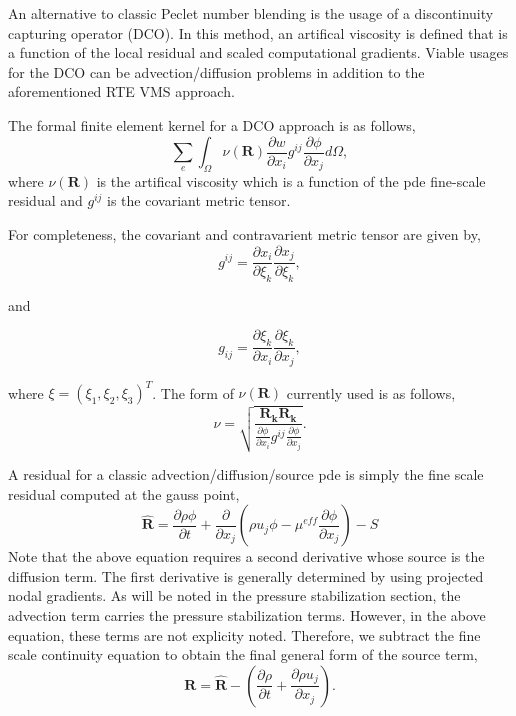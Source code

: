 An alternative to classic Peclet number blending is the usage of a discontinuity capturing operator (DCO).
In this method, an artifical viscosity is defined that is a function of the local residual and scaled computational 
gradients. Viable usages for the DCO can be advection/diffusion problems in addition to the aforementioned RTE
VMS approach.

The formal finite element kernel for a DCO approach is as follows,
\begin{equation}
  \sum_e \int_\Omega \nu(\mathbf{R}) \frac{\partial w}{\partial x_i} g^{ij} \frac{\partial \phi} {\partial x_j} d\Omega,
\label{dcoFEMForm}
\end{equation}
where $\nu(\mathbf{R})$ is the artifical viscosity which is a function of the pde fine-scale residual and $g^{ij}$ 
is the covariant metric tensor.

For completeness, the covariant and contravarient metric tensor are given by,
\begin{equation}
  g^{ij} = \frac{\partial x_i} {\partial \xi_k}\frac{\partial x_j} {\partial \xi_k},
\label{coVariant}
\end{equation}

 and

\begin{equation}
  g_{ij} = \frac{\partial \xi_k} {\partial x_i} \frac{\partial \xi_k} {\partial x_j},
\label{coVariant}
\end{equation}

where $\xi = (\xi_1, \xi_2, \xi_3)^T$.
%
The form of $\nu(\mathbf{R})$ currently used is as follows,
\begin{equation}
  \nu = \sqrt{ \frac{\mathbf{R_k} \mathbf{R_k}} {\frac {\partial \phi}{\partial x_i} g^{ij} \frac{\partial \phi}{\partial x_j}} }.
\label{nuOne}
\end{equation}

A residual for a classic advection/diffusion/source pde is simply the fine scale residual computed at the gauss point,
\begin{equation}
 \mathbf{\hat R} = \frac{\partial \rho \phi}{\partial t} + \frac{\partial}{\partial x_j} (\rho u_j \phi - \mu^{eff} \frac{\partial \phi}{\partial x_j}) -S
 \label{dcoResidual}
\end{equation}
Note that the above equation requires a second derivative whose source is the diffusion term. The first derivative 
is generally determined by using projected nodal gradients. As will be noted in the pressure stabilization section, 
the advection term carries the pressure stabilization terms. However, in the above equation, these terms are not 
explicity noted. Therefore, we subtract the fine scale continuity equation to obtain the final general form of 
the source term,
\begin{equation}
 \mathbf{R} = \mathbf{\hat R} -  (\frac{\partial \rho}{\partial t} + \frac{\partial \rho u_j }{\partial x_j}).
 \label{dcoResidual}
\end{equation}

